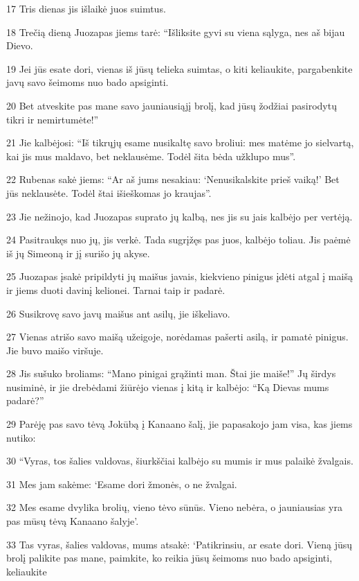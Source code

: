 \par 17 Tris dienas jis išlaikė juos suimtus. 
\par 18 Trečią dieną Juozapas jiems tarė: “Išliksite gyvi su viena sąlyga, nes aš bijau Dievo. 
\par 19 Jei jūs esate dori, vienas iš jūsų telieka suimtas, o kiti keliaukite, pargabenkite javų savo šeimoms nuo bado apsiginti. 
\par 20 Bet atveskite pas mane savo jauniausiąjį brolį, kad jūsų žodžiai pasirodytų tikri ir nemirtumėte!” 
\par 21 Jie kalbėjosi: “Iš tikrųjų esame nusikaltę savo broliui: mes matėme jo sielvartą, kai jis mus maldavo, bet neklausėme. Todėl šita bėda užklupo mus”. 
\par 22 Rubenas sakė jiems: “Ar aš jums nesakiau: ‘Nenusikalskite prieš vaiką!’ Bet jūs neklausėte. Todėl štai išieškomas jo kraujas”. 
\par 23 Jie nežinojo, kad Juozapas suprato jų kalbą, nes jis su jais kalbėjo per vertėją. 
\par 24 Pasitraukęs nuo jų, jis verkė. Tada sugrįžęs pas juos, kalbėjo toliau. Jis paėmė iš jų Simeoną ir jį surišo jų akyse. 
\par 25 Juozapas įsakė pripildyti jų maišus javais, kiekvieno pinigus įdėti atgal į maišą ir jiems duoti davinį kelionei. Tarnai taip ir padarė. 
\par 26 Susikrovę savo javų maišus ant asilų, jie iškeliavo. 
\par 27 Vienas atrišo savo maišą užeigoje, norėdamas pašerti asilą, ir pamatė pinigus. Jie buvo maišo viršuje. 
\par 28 Jis sušuko broliams: “Mano pinigai grąžinti man. Štai jie maiše!” Jų širdys nusiminė, ir jie drebėdami žiūrėjo vienas į kitą ir kalbėjo: “Ką Dievas mums padarė?” 
\par 29 Parėję pas savo tėvą Jokūbą į Kanaano šalį, jie papasakojo jam visa, kas jiems nutiko: 
\par 30 “Vyras, tos šalies valdovas, šiurkščiai kalbėjo su mumis ir mus palaikė žvalgais. 
\par 31 Mes jam sakėme: ‘Esame dori žmonės, o ne žvalgai. 
\par 32 Mes esame dvylika brolių, vieno tėvo sūnūs. Vieno nebėra, o jauniausias yra pas mūsų tėvą Kanaano šalyje’. 
\par 33 Tas vyras, šalies valdovas, mums atsakė: ‘Patikrinsiu, ar esate dori. Vieną jūsų brolį palikite pas mane, paimkite, ko reikia jūsų šeimoms nuo bado apsiginti, keliaukite 
